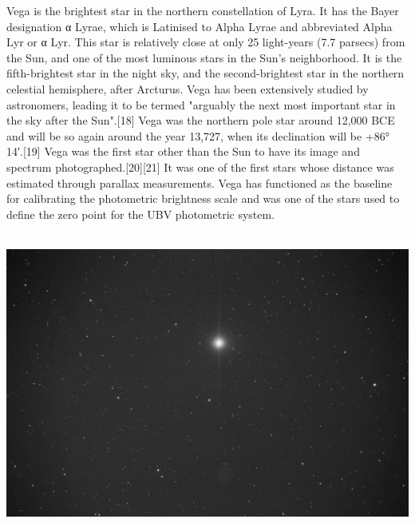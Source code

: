 {\footnotesize\color{white}
Vega is the brightest star in the northern constellation of Lyra. It has the Bayer designation α Lyrae, which is Latinised to Alpha Lyrae and abbreviated Alpha Lyr or α Lyr. This star is relatively close at only 25 light-years (7.7 parsecs) from the Sun, and one of the most luminous stars in the Sun's neighborhood. It is the fifth-brightest star in the night sky, and the second-brightest star in the northern celestial hemisphere, after Arcturus. Vega has been extensively studied by astronomers, leading it to be termed "arguably the next most important star in the sky after the Sun".[18] Vega was the northern pole star around 12,000 BCE and will be so again around the year 13,727, when its declination will be +86° 14′.[19] Vega was the first star other than the Sun to have its image and spectrum photographed.[20][21] It was one of the first stars whose distance was estimated through parallax measurements. Vega has functioned as the baseline for calibrating the photometric brightness scale and was one of the stars used to define the zero point for the UBV photometric system.


}\ \\
\includegraphics[width=\textwidth]{../Imaging//Grayscale/Vega_Star.jpg}
